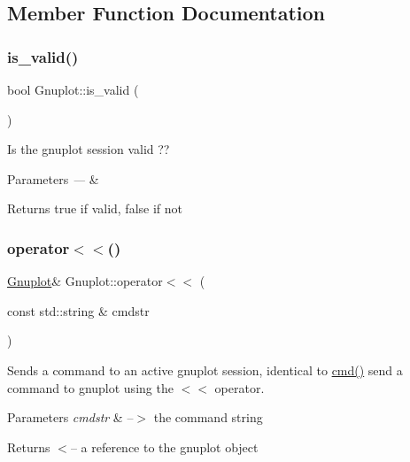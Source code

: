 \subsection{Member Function Documentation}
\mbox{\label{class_gnuplot_a3135ffebb308b50c4f3178a62b23ab03}} 
\subsubsection{\texorpdfstring{is\+\_\+valid()}{is\_valid()}}
{\footnotesize\ttfamily bool Gnuplot\+::is\+\_\+valid (\begin{DoxyParamCaption}{ }\end{DoxyParamCaption})\hspace{0.3cm}{\ttfamily [inline]}}



Is the gnuplot session valid ?? 


\begin{DoxyParams}{Parameters}
{\em ---} & \\
\hline
\end{DoxyParams}
\begin{DoxyReturn}{Returns}
true if valid, false if not 
\end{DoxyReturn}
\mbox{\label{class_gnuplot_afb69631c7a498077e378a3cbb56f38c8}} 
\subsubsection{\texorpdfstring{operator$<$$<$()}{operator<<()}}
{\footnotesize\ttfamily \hyperlink{class_gnuplot}{Gnuplot}\& Gnuplot\+::operator$<$$<$ (\begin{DoxyParamCaption}\item[{const std\+::string \&}]{cmdstr }\end{DoxyParamCaption})\hspace{0.3cm}{\ttfamily [inline]}}



Sends a command to an active gnuplot session, identical to \hyperlink{class_gnuplot_a07607803ede8dd5416906df0a1924fc5}{cmd()} send a command to gnuplot using the $<$$<$ operator. 


\begin{DoxyParams}{Parameters}
{\em cmdstr} & --$>$ the command string\\
\hline
\end{DoxyParams}
\begin{DoxyReturn}{Returns}
$<$-- a reference to the gnuplot object 
\end{DoxyReturn}
\mbox{\label{class_gnuplot_a42dfb8c9d4636745c7be277ed818e849}} 
